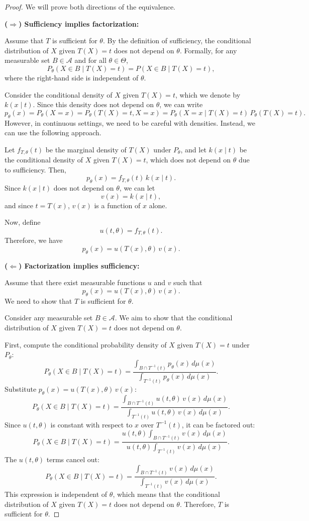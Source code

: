 \documentclass{article}
\begin{document}
\begin{proof}
We will prove both directions of the equivalence.

\textbf{($\Rightarrow$) Sufficiency implies factorization:}

Assume that $T$ is sufficient for $\theta$. By the definition of sufficiency, the conditional distribution of $X$ given $T(X) = t$ does not depend on $\theta$. Formally, for any measurable set $B \in \mathcal{A}$ and for all $\theta \in \Theta$,
\[
P_\theta(X \in B \mid T(X) = t) = P(X \in B \mid T(X) = t),
\]
where the right-hand side is independent of $\theta$.

Consider the conditional density of $X$ given $T(X) = t$, which we denote by $k(x \mid t)$. Since this density does not depend on $\theta$, we can write
\[
p_\theta(x) = P_\theta(X = x) = P_\theta(T(X) = t, X = x) = P_\theta(X = x \mid T(X) = t) \, P_\theta(T(X) = t).
\]
However, in continuous settings, we need to be careful with densities. Instead, we can use the following approach.

Let $f_{T, \theta}(t)$ be the marginal density of $T(X)$ under $P_\theta$, and let $k(x \mid t)$ be the conditional density of $X$ given $T(X) = t$, which does not depend on $\theta$ due to sufficiency. Then,
\[
p_\theta(x) = f_{T, \theta}(t) \, k(x \mid t).
\]
Since $k(x \mid t)$ does not depend on $\theta$, we can let
\[
v(x) = k(x \mid t),
\]
and since $t = T(x)$, $v(x)$ is a function of $x$ alone.

Now, define
\[
u(t, \theta) = f_{T, \theta}(t).
\]
Therefore, we have
\[
p_\theta(x) = u(T(x), \theta) \, v(x).
\]

\textbf{($\Leftarrow$) Factorization implies sufficiency:}

Assume that there exist measurable functions $u$ and $v$ such that
\[
p_\theta(x) = u(T(x), \theta) \, v(x).
\]
We need to show that $T$ is sufficient for $\theta$.

Consider any measurable set $B \in \mathcal{A}$. We aim to show that the conditional distribution of $X$ given $T(X) = t$ does not depend on $\theta$.

First, compute the conditional probability density of $X$ given $T(X) = t$ under $P_\theta$:
\[
P_\theta(X \in B \mid T(X) = t) = \frac{\int_{B \cap T^{-1}(t)} p_\theta(x) \, d\mu(x)}{\int_{T^{-1}(t)} p_\theta(x) \, d\mu(x)}.
\]
Substitute $p_\theta(x) = u(T(x), \theta) \, v(x)$:
\[
P_\theta(X \in B \mid T(X) = t) = \frac{\int_{B \cap T^{-1}(t)} u(t, \theta) \, v(x) \, d\mu(x)}{\int_{T^{-1}(t)} u(t, \theta) \, v(x) \, d\mu(x)}.
\]
Since $u(t, \theta)$ is constant with respect to $x$ over $T^{-1}(t)$, it can be factored out:
\[
P_\theta(X \in B \mid T(X) = t) = \frac{u(t, \theta) \int_{B \cap T^{-1}(t)} v(x) \, d\mu(x)}{u(t, \theta) \int_{T^{-1}(t)} v(x) \, d\mu(x)}.
\]
The $u(t, \theta)$ terms cancel out:
\[
P_\theta(X \in B \mid T(X) = t) = \frac{\int_{B \cap T^{-1}(t)} v(x) \, d\mu(x)}{\int_{T^{-1}(t)} v(x) \, d\mu(x)}.
\]
This expression is independent of $\theta$, which means that the conditional distribution of $X$ given $T(X) = t$ does not depend on $\theta$. Therefore, $T$ is sufficient for $\theta$.
\end{proof}
\end{document}
